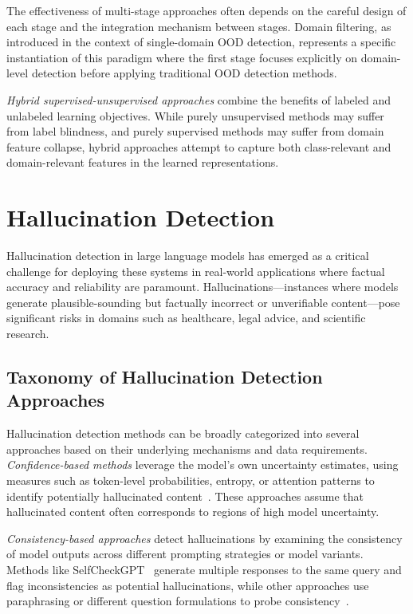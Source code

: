 \documentclass[11pt, oneside]{book}
\theoremstyle{plain}
\theoremstyle{definition}
\theoremstyle{remark}
\begin{document}
The effectiveness of multi-stage approaches often depends on the careful design of each stage and the integration mechanism between stages. Domain filtering, as introduced in the context of single-domain OOD detection, represents a specific instantiation of this paradigm where the first stage focuses explicitly on domain-level detection before applying traditional OOD detection methods.

\emph{Hybrid supervised-unsupervised approaches} combine the benefits of labeled and unlabeled learning objectives. While purely unsupervised methods may suffer from label blindness, and purely supervised methods may suffer from domain feature collapse, hybrid approaches attempt to capture both class-relevant and domain-relevant features in the learned representations.

\section{Hallucination Detection}

Hallucination detection in large language models has emerged as a critical challenge for deploying these systems in real-world applications where factual accuracy and reliability are paramount. Hallucinations—instances where models generate plausible-sounding but factually incorrect or unverifiable content—pose significant risks in domains such as healthcare, legal advice, and scientific research.

\subsection{Taxonomy of Hallucination Detection Approaches}

Hallucination detection methods can be broadly categorized into several approaches based on their underlying mechanisms and data requirements. \emph{Confidence-based methods} leverage the model's own uncertainty estimates, using measures such as token-level probabilities, entropy, or attention patterns to identify potentially hallucinated content~\citep{manakul2023selfcheckgpt,zhang2023sirens}. These approaches assume that hallucinated content often corresponds to regions of high model uncertainty.

\emph{Consistency-based approaches} detect hallucinations by examining the consistency of model outputs across different prompting strategies or model variants. Methods like SelfCheckGPT~\citep{manakul2023selfcheckgpt} generate multiple responses to the same query and flag inconsistencies as potential hallucinations, while other approaches use paraphrasing or different question formulations to probe consistency~\citep{li2023halueval}.
\end{document}
